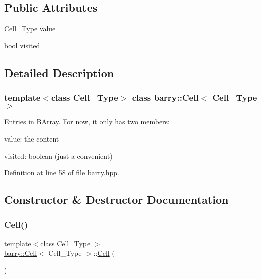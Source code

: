 \subsection*{Public Attributes}
\begin{DoxyCompactItemize}
\item 
Cell\+\_\+\+Type \hyperlink{classbarry_1_1_cell_a52918ded332c6a12109b5962d6bf3ae9}{value}
\item 
bool \hyperlink{classbarry_1_1_cell_ad7800879e5079e6b5a3982827adc38c1}{visited}
\end{DoxyCompactItemize}


\subsection{Detailed Description}
\subsubsection*{template$<$class Cell\+\_\+\+Type$>$\newline
class barry\+::\+Cell$<$ Cell\+\_\+\+Type $>$}

\hyperlink{classbarry_1_1_entries}{Entries} in \hyperlink{classbarry_1_1_b_array}{B\+Array}. For now, it only has two members\+: 


\begin{DoxyItemize}
\item value\+: the content
\item visited\+: boolean (just a convenient) 
\end{DoxyItemize}

Definition at line 58 of file barry.\+hpp.



\subsection{Constructor \& Destructor Documentation}
\mbox{\label{classbarry_1_1_cell_aa7beee933fc291cbc4ac84ec3ab63352}} 
\subsubsection{\texorpdfstring{Cell()}{Cell()}\hspace{0.1cm}{\footnotesize\ttfamily [1/5]}}
{\footnotesize\ttfamily template$<$class Cell\+\_\+\+Type $>$ \\
\hyperlink{classbarry_1_1_cell}{barry\+::\+Cell}$<$ Cell\+\_\+\+Type $>$\+::\hyperlink{classbarry_1_1_cell}{Cell} (\begin{DoxyParamCaption}{ }\end{DoxyParamCaption})}

